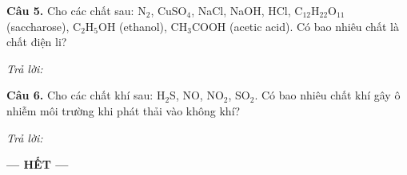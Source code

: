 \documentclass[11pt,a4paper]{article}
\begin{document}
\textbf{Câu 5.} Cho các chất sau: N$_{2}$, CuSO$_{4}$, NaCl, NaOH, HCl, C$_{12}$H$_{22}$O$_{11}$ (saccharose), C$_{2}$H$_{5}$OH (ethanol), CH$_{3}$COOH (acetic acid). Có bao nhiêu chất là chất điện li?

\textit{Trả lời:} \dotfill\par\vspace{2pt}

\textbf{Câu 6.} Cho các chất khí sau: H$_{2}$S, NO, NO$_{2}$, SO$_{2}$. Có bao nhiêu chất khí gây ô nhiễm môi trường khi phát thải vào không khí?

\textit{Trả lời:} \dotfill\par\vspace{2pt}

\begin{center}
\textbf{--- HẾT ---}
\end{center}
\end{document}

